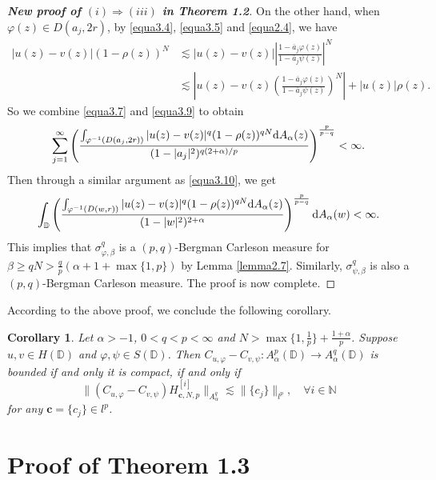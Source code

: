 \documentclass[preprint,12pt,times]{elsarticle}
\newtheorem{corollary}[theorem]{Corollary}
\theoremstyle{definition}
\theoremstyle{remark}
\numberwithin{equation}{section}
\begin{document}
\begin{proof}[{\bf New proof of $(i)\Rightarrow (iii)$ in Theorem 1.2}]
On the other hand, when $\varphi(z)\in D(a_j,2r)$, by \eqref{equa3.4}, \eqref{equa3.5} and \eqref{equa2.4}, we have
\begin{equation*}
\begin{split}
|u(z)-v(z)|(1-\rho(z))^N&\lesssim |u(z)-v(z)|\left|\frac{1-\overline{a}_j\varphi(z)}{1-\overline{a}_j\psi(z)}\right|^N\\
&\lesssim \left|u(z)-v(z)\left(\frac{1-\overline{a}_j\varphi(z)}{1-\overline{a}_j\psi(z)}\right)^N\right|+|u(z)|\rho(z).
\end{split}
\end{equation*}
So we combine \eqref{equa3.7} and \eqref{equa3.9} to obtain
\begin{equation*}
\sum_{j=1}^{\infty}\left(\frac{\int_{\varphi^{-1}(D(a_j,2r))}|u(z)-v(z)|^q(1-\rho(z))^{qN}{\rm d}A_{\alpha}(z)}{(1-|a_j|^2)^{q(2+\alpha)/p}}\right)^{\frac{p}{p-q}}<\infty.
\end{equation*}
Then through a similar argument as \eqref{equa3.10}, we get
\begin{equation*}
\int_{\mathbb{D}}\left(\frac{\int_{\varphi^{-1}(D(w,r))}|u(z)-v(z)|^q(1-\rho(z))^{qN}{\rm d}A_{\alpha}(z)}{(1-|w|^2)^{2+\alpha}}\right)^{\frac{p}{p-q}}{\rm d}A_{\alpha}(w)<\infty.
\end{equation*}
This implies that $\sigma_{\varphi,\beta}^q$ is a $(p,q)$-Bergman Carleson measure for $\beta\geq qN>\frac{q}{p}(\alpha+1+\max\{1,p\})$ by Lemma \ref{lemma2.7}. Similarly, $\sigma_{\psi,\beta}^q$ is also a $(p,q)$-Bergman Carleson measure. The proof is now complete.
\end{proof}

According to the above proof, we conclude the following corollary.

\begin{corollary}\label{corollary3.2}
Let $\alpha>-1$, $0<q<p<\infty$ and $N>\max\{1,\frac{1}{p}\}+\frac{1+\alpha}{p}$. Suppose $u,v\in H(\mathbb{D})$ and $\varphi,\psi\in S(\mathbb{D})$. Then $C_{u,\varphi}-C_{v,\psi}: A_{\alpha}^p(\mathbb{D})\to A_{\alpha}^q(\mathbb{D})$ is bounded if and only it is compact, if and only if
\[\|(C_{u,\varphi}-C_{v,\psi})H_{{\mathbf{c}},N,p}^{[i]}\|_{A_{\alpha}^q}\lesssim \|\{c_j\}\|_{l^p},\quad \forall i\in\mathbb{N}\]
for any $\mathbf{c}=\{c_j\}\in l^p$.
\end{corollary}


\section{Proof of Theorem 1.3}
\end{document}
